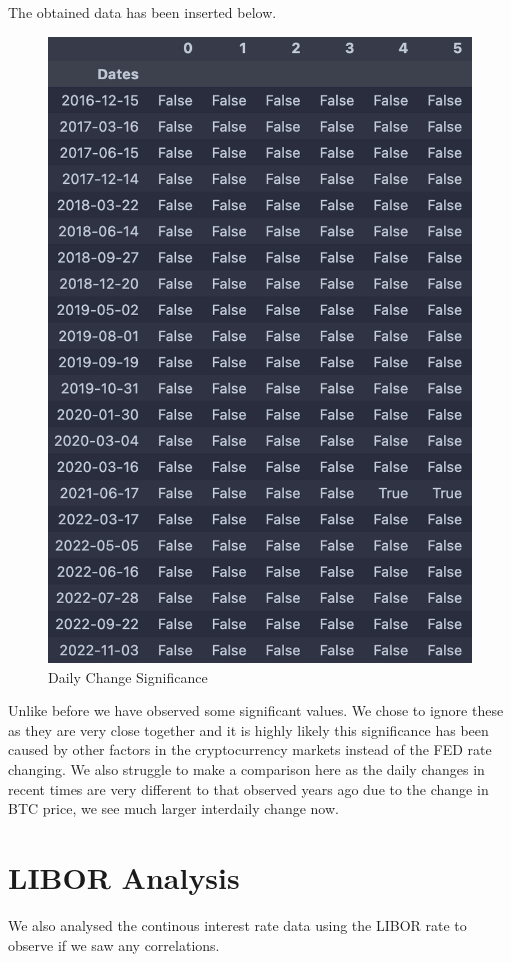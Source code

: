 \documentclass[12pt]{article}
\begin{document}
The obtained data has been inserted below.
\begin{figure}[H]
   \includegraphics[scale=0.7]{research_project/text/paper/10.png}
   \centering
   \caption{Daily Change Significance}
   \label{fig:FED Rate evolution 2016 - 2022}
\end{figure}
Unlike before we have observed some significant values. We chose to ignore these as they are very close together and it is highly likely this significance has been caused by other factors in the cryptocurrency markets instead of the FED rate changing. We also struggle to make a comparison here as the daily changes in recent times are very different to that observed years ago due to the change in BTC price, we see much larger interdaily change now. 

\newpage
\section{LIBOR Analysis}
We also analysed the continous interest rate data using the LIBOR rate to observe if we saw any correlations.\\
\end{document}

